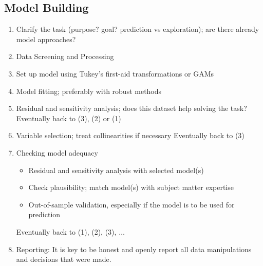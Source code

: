 \subsection{Model Building}
\begin{enumerate}
\item Clarify the task (purpose? goal? prediction vs exploration);
are there already model approaches?
\item Data Screening and Processing
\item Set up model using Tukey’s first-aid transformations or GAMs
\item Model fitting; preferably with robust methods
\item Residual and sensitivity analysis;
does this dataset help solving the task?
\newline
Eventually back to (3), (2) or (1)
\item Variable selection; treat collinearities if necessary
\newline
Eventually back to (3)
\item Checking model adequacy
\begin{itemize}
\item Residual and sensitivity analysis with selected model(s)
\item Check plausibility; match model(s) with subject matter expertise
\item Out-of-sample validation, especially if the model is to be used for
prediction
\end{itemize}
Eventually back to (1), (2), (3), $\ldots$
\item Reporting:
It is key to be honest and openly report all data manipulations and
decisions that were made.
\end{enumerate}